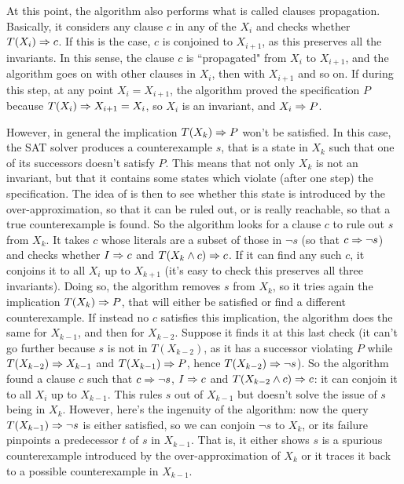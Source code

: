 At this point, the algorithm also performs what is called clauses propagation. Basically, it considers any clause $c$ in any of the $X_i$ and checks whether $T(X_i) \Rightarrow c$. If this is the case, $c$ is conjoined to $X_{i+1}$, as this preserves all the invariants. In this sense, the clause $c$ is ``propagated" from $X_i$ to $X_{i+1}$, and the algorithm goes on with other clauses in $X_i$, then with $X_{i+1}$ and so on. If during this step, at any point $X_i = X_{i+1}$, the algorithm proved the specification $P$ because $T(X_i) \Rightarrow X_{i+1} = X_i$, so $X_i$ is an invariant, and $X_i \Rightarrow P$.

However, in general the implication $T(X_k) \Rightarrow P$ won't be satisfied. In this case, the SAT solver produces a counterexample $s$, that is a state in $X_k$ such that one of its successors doesn't satisfy $P$. This means that not only $X_k$ is not an invariant, but that it contains some states which violate (after one step) the specification. The idea of  is then to see whether this state is introduced by the over-approximation, so that it can be ruled out, or is really reachable, so that a true counterexample is found.
So the algorithm looks for a clause $c$ to rule out $s$ from $X_k$. It takes $c$ whose literals are a subset of those in $\lnot s$ (so that $c \Rightarrow \lnot s$) and checks whether $I \Rightarrow c$ and $T(X_k \land c) \Rightarrow c$. If it can find any such $c$, it conjoins it to all $X_i$ up to $X_{k+1}$ (it's easy to check this preserves all three invariants). Doing so, the algorithm removes $s$ from $X_k$, so it tries again the implication $T(X_k) \Rightarrow P$, that will either be satisfied or find a different counterexample.
If instead no $c$ satisfies this implication, the algorithm does the same for $X_{k-1}$, and then for $X_{k-2}$. Suppose it finds it at this last check (it can't go further because $s$ is not in $T(X_{k-2})$, as it has a successor violating $P$ while $T(X_{k-2}) \Rightarrow X_{k-1}$ and $T(X_{k-1}) \Rightarrow P$, hence $T(X_{k-2}) \Rightarrow \lnot s$). So the algorithm found a clause $c$ such that $c \Rightarrow \lnot s$, $I \Rightarrow c$ and $T(X_{k-2} \land c) \Rightarrow c$: it can conjoin it to all $X_i$ up to $X_{k-1}$. This rules $s$ out of $X_{k-1}$ but doesn't solve the issue of $s$ being in $X_{k}$. However, here's the ingenuity of the algorithm: now the query $T(X_{k-1}) \Rightarrow \lnot s$ is either satisfied, so we can conjoin $\lnot s$ to $X_k$, or its failure pinpoints a predecessor $t$ of $s$ in $X_{k-1}$.
That is, it either shows $s$ is a spurious counterexample introduced by the over-approximation of $X_k$ or it traces it back to a possible counterexample in $X_{k-1}$.


